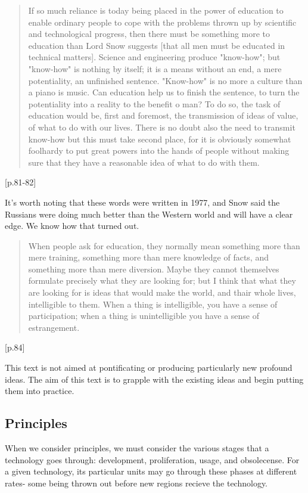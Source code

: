 \documentclass[letterpaper]{article}
\begin{document}
\begin{quote}
If so much reliance is today being placed in the power of education to enable ordinary people to cope with the problems thrown up by scientific and technological progress, then there must be something more to education than Lord Snow suggests [that all men must be educated in technical matters]. Science and engineering produce "know-how"; but "know-how" is nothing by itself; it is a means without an end, a mere potentiality, an unfinished sentence. "Know-how" is no more a culture than a piano is music. Can education help us to finish the sentence, to turn the potentiality into a reality to the benefit o man? To do so, the task of education would be, first and foremost, the transmission of ideas of value, of what to do with our lives. There is no doubt also the need to transmit know-how but this must take second place, for it is obviously somewhat foolhardy to put great powers into the hands of people without making sure that they have a reasonable idea of what to do with them.
\end{quote}[p.81-82]

It's worth noting that these words were written in 1977, and Snow said the Russians were doing much better than the Western world and will have a clear edge. We know how that turned out.

\begin{quote}
When people ask for education, they normally mean something more than mere training, something more than mere knowledge of facts, and something more than mere diversion. Maybe they cannot themselves formulate precisely what they are looking for; but I think that what they are looking for is ideas that would make the world, and thair whole lives, intelligible to them. When a thing is intelligible, you have a sense of participation; when a thing is unintelligible you have a sense of estrangement.
\end{quote}[p.84]

This text is not aimed at pontificating or producing particularly new profound ideas. The aim of this text is to grapple with the existing ideas and begin putting them into practice.

\subsection{Principles}

When we consider principles, we must consider the various stages that a technology goes through: development, proliferation, usage, and obsolecense. For a given technology, its particular units may go through these phases at different rates- some being thrown out before new regions recieve the technology.
\end{document}
